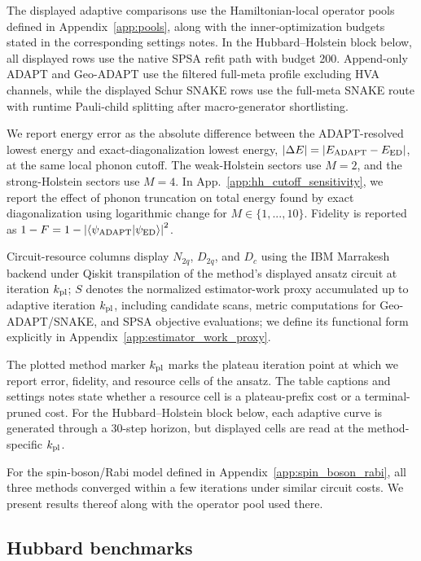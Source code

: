 \documentclass[
  reprint,
  amsmath,
  amssymb,
  aps,
  pra,
  nofootinbib,
  superscriptaddress,
  floatfix
]{revtex4-2}
\newcommand{\braket}[2]{\langle #1|#2\rangle}
\begin{document}
The displayed adaptive comparisons use the Hamiltonian-local operator pools defined in Appendix~\ref{app:pools}, along with the inner-optimization budgets stated in the corresponding settings notes. In the Hubbard--Holstein block below, all displayed rows use the native SPSA refit path with budget 200. Append-only ADAPT and Geo-ADAPT use the filtered full-meta profile excluding HVA channels, while the displayed Schur SNAKE rows use the full-meta SNAKE route with runtime Pauli-child splitting after macro-generator shortlisting.

We report energy error as the absolute difference between the ADAPT-resolved lowest energy and exact-diagonalization lowest energy, \(|\Delta E|=|E_{\rm ADAPT}-E_{\rm ED}|\), at the same local phonon cutoff. The weak-Holstein sectors use \(M=2\), and the strong-Holstein sectors use \(M=4\).
In App.~\ref{app:hh_cutoff_sensitivity}, we report the effect of phonon truncation on total energy found by exact diagonalization using logarithmic change for $M\in\{1,...,10\}.$ Fidelity is reported as \(1-F=1-\left|\braket{\psi_{\rm ADAPT}}{\psi_{\rm ED}}\right|^2\).

Circuit-resource columns display \(N_{2q}\), \(D_{2q}\), and \(D_c\) using the IBM Marrakesh backend under Qiskit transpilation of the method's displayed ansatz circuit at iteration $k_{\rm{pl}}$; \(S\) denotes the normalized estimator-work proxy accumulated up to adaptive iteration $k_{\rm{pl}}$, including candidate scans, metric computations for Geo-ADAPT/SNAKE, and SPSA objective evaluations; we define its functional form explicitly in Appendix~\ref{app:estimator_work_proxy}.


The plotted method marker \(k_{\rm pl}\) marks the plateau iteration point at which we report error, fidelity, and resource cells of the ansatz. The table captions and settings notes state whether a resource cell is a plateau-prefix cost or a terminal-pruned cost. For the Hubbard--Holstein block below, each adaptive curve is generated through a 30-step horizon, but displayed cells are read at the method-specific \(k_{\rm pl}\).

For the spin-boson/Rabi model defined in Appendix~\ref{app:spin_boson_rabi}, all three methods converged within a few iterations under similar circuit costs. We present results thereof along with the operator pool used there.

\subsection{Hubbard benchmarks}
\end{document}
